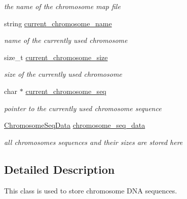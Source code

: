 \begin{DoxyCompactItemize}
\begin{DoxyCompactList}\small\item\em the name of the chromosome map file \end{DoxyCompactList}\item 
\hypertarget{classChromosomes_ab3b502eec7bd2028297300aeb47b5844}{
string \hyperlink{classChromosomes_ab3b502eec7bd2028297300aeb47b5844}{current\_\-chromosome\_\-name}}
\label{classChromosomes_ab3b502eec7bd2028297300aeb47b5844}

\begin{DoxyCompactList}\small\item\em name of the currently used chromosome \end{DoxyCompactList}\item 
\hypertarget{classChromosomes_afb59cb80755187f4546573f10110e669}{
size\_\-t \hyperlink{classChromosomes_afb59cb80755187f4546573f10110e669}{current\_\-chromosome\_\-size}}
\label{classChromosomes_afb59cb80755187f4546573f10110e669}

\begin{DoxyCompactList}\small\item\em size of the currently used chromosome \end{DoxyCompactList}\item 
\hypertarget{classChromosomes_af640cf0f09b109b3d46d70aba9207a2e}{
char $\ast$ \hyperlink{classChromosomes_af640cf0f09b109b3d46d70aba9207a2e}{current\_\-chromosome\_\-seq}}
\label{classChromosomes_af640cf0f09b109b3d46d70aba9207a2e}

\begin{DoxyCompactList}\small\item\em pointer to the currently used chromosome sequence \end{DoxyCompactList}\item 
\hypertarget{classChromosomes_a673169d55aa0b94815e17b41566d4d8c}{
\hyperlink{classChromosomes_a4a233d2b7fabc1a589cbbafd5d0ea243}{ChromosomeSeqData} \hyperlink{classChromosomes_a673169d55aa0b94815e17b41566d4d8c}{chromosome\_\-seq\_\-data}}
\label{classChromosomes_a673169d55aa0b94815e17b41566d4d8c}

\begin{DoxyCompactList}\small\item\em all chromosomes sequences and their sizes are stored here \end{DoxyCompactList}\end{DoxyCompactItemize}


\subsection{Detailed Description}
This class is used to store chromosome DNA sequences. 

